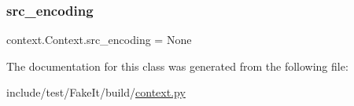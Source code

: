 \mbox{\label{classcontext_1_1Context_a3d1b84dad136691555472097d363843f}} 
\subsubsection{\texorpdfstring{src\_encoding}{src\_encoding}}
{\footnotesize\ttfamily context.\+Context.\+src\+\_\+encoding = None\hspace{0.3cm}{\ttfamily [static]}}



The documentation for this class was generated from the following file\+:\begin{DoxyCompactItemize}
\item 
include/test/\+Fake\+It/build/\mbox{\hyperlink{context_8py}{context.\+py}}\end{DoxyCompactItemize}
